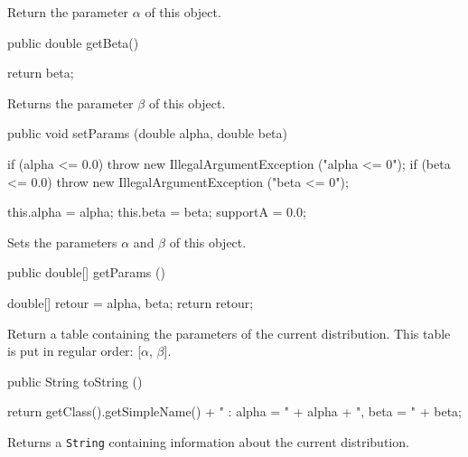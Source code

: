   \begin{tabb} Return the parameter $\alpha$ of this object.
  \end{tabb}
\begin{code}

   public double getBeta()\begin{hide} {
      return beta;
   }\end{hide}
\end{code}
  \begin{tabb} Returns the parameter $\beta$ of this object.
  \end{tabb}
\begin{code}

   public void setParams (double alpha, double beta)\begin{hide} {
      if (alpha <= 0.0)
         throw new IllegalArgumentException ("alpha <= 0");
      if (beta <= 0.0)
         throw new IllegalArgumentException ("beta <= 0");

      this.alpha  = alpha;
      this.beta = beta;
      supportA = 0.0;
   }\end{hide}
\end{code}
  \begin{tabb} Sets the parameters $\alpha$ and $\beta$ of this object.
  \end{tabb}
\begin{code}

   public double[] getParams ()\begin{hide} {
      double[] retour = {alpha, beta};
      return retour;
   }\end{hide}
\end{code}
\begin{tabb}
   Return a table containing the parameters of the current distribution.
   This table is put in regular order: [$\alpha$, $\beta$].
\end{tabb}
\begin{hide}\begin{code}

   public String toString ()\begin{hide} {
      return getClass().getSimpleName() + " : alpha = " + alpha + ", beta = " + beta;
   }\end{hide}
\end{code}
\begin{tabb}
   Returns a \texttt{String} containing information about the current distribution.
\end{tabb}\end{hide}
\begin{code}\begin{hide}
}\end{hide}
\end{code}
